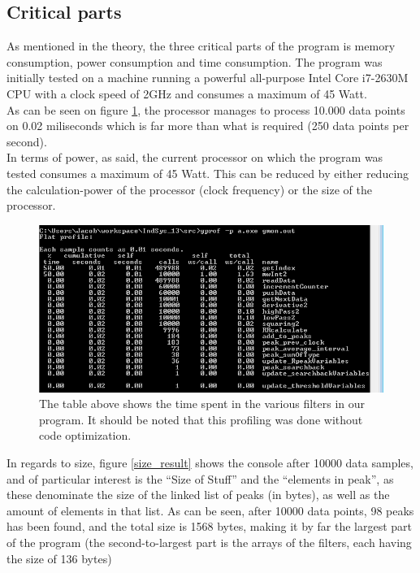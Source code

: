 \documentclass[12pt,a4paper]{article}
\begin{document}
\subsection{Critical parts}
	As mentioned in the theory, the three critical parts of the program is memory consumption, power consumption and time consumption. The program was initially tested on a machine running a powerful all-purpose Intel Core i7-2630M CPU with a clock speed of 2GHz and consumes a maximum of 45 Watt. \\
	As can be seen on figure \ref{time_result}, the processor manages to process 10.000 data points on 0.02 miliseconds which is far more than what is required (250 data points per second).\\
	In terms of power, as said, the current processor on which the program was tested consumes a maximum of 45 Watt. This can be reduced by either reducing the calculation-power of the processor (clock frequency) or the size of the processor.\\
	
	\begin{figure}[h!]
		\centering
			\includegraphics[width=1\textwidth]{Screenshots/time_result.png}
		\caption{The table above shows the time spent in the various filters in our program. It should be noted that this profiling was done without code optimization.}
		\label{time_result}
	\end{figure}
	
	In regards to size, figure \ref{size_result} shows the console after 10000 data samples, and of particular interest is the ``Size of Stuff'' and the ``elements in peak'', as these denominate the size of the linked list of peaks (in bytes), as well as the amount of elements in that list. As can be seen, after 10000 data points, 98 peaks has been found, and the total size is 1568 bytes, making it by far the largest part of the program (the second-to-largest part is the arrays of the filters, each having the size of 136 bytes)
	
\end{document}
